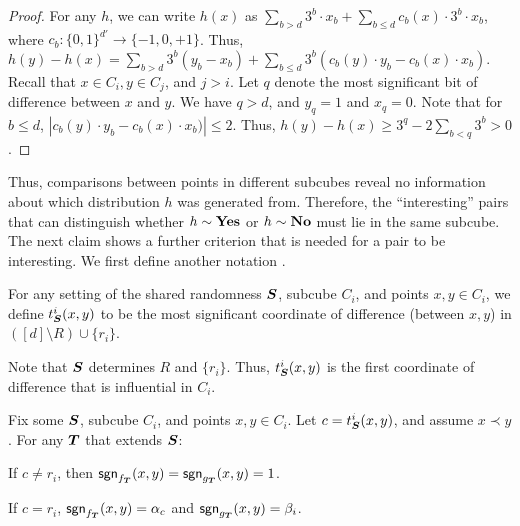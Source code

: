 \begin{proof}
	For any $h$, we can write $h(x)$ as $\sum_{b > d} 3^b \cdot x_b + \sum_{b \leq d} c_b(x) \cdot 3^b \cdot x_b$,
	where $c_b: \{0,1\}^{d'} \to \{-1,0,+1\}$. Thus,
	$h(y) - h(x) = \sum_{b > d} 3^b(y_b - x_b) + \sum_{b \leq d} 3^b(c_b(y) \cdot y_b - c_b(x) \cdot x_b)$.
	Recall that $x \in C_i , y \in C_j$, and $j > i$. Let $q$ denote
	the most significant bit of difference between $x$ and $y$. We have
	$q > d$, and $y_q = 1$ and $x_q = 0$. Note that for $b \leq d$, $|c_b(y) \cdot y_b - c_b(x) \cdot x_b)| \leq 2$.
	Thus, $h(y) - h(x) \geq 3^q - 2\sum_{b < q} 3^b > 0$.
\end{proof}

\noindent Thus, comparisons between points in different subcubes reveal no information
about which distribution $h$ was generated from. Therefore, the ``interesting'' pairs that can distinguish whether $h \sim \mathbf{Yes}$ or $h \sim \mathbf {No}$ must lie in the same subcube.
The next claim shows a further criterion that is needed for a pair to be interesting.
We first define another notation .

\begin{definition} \label{def:t} 
For any setting of the shared randomness $\boldsymbol{S}$,
subcube $C_i$, and points $x,y \in C_i$, we define $t^{i}_{\boldsymbol{S}}(x,y)$
to be the most significant coordinate of difference (between $x,y$)
in $([d] \setminus R) \cup \{r_i\}$.
\end{definition}

\noindent Note that $\boldsymbol{S}$ determines $R$ and $\{r_i\}$.
Thus, $t^{i}_{\boldsymbol{S}}(x,y)$ is the first coordinate of difference that is influential
in $C_i$.

\begin{claim}\label{clm:interesting}
Fix some $\boldsymbol{S}$, subcube $C_i$, and points $x,y \in C_i$.
Let $c = t^{i}_{\boldsymbol{S}}(x,y)$, and assume $x \prec y$.
For any $\boldsymbol{T}$ that extends $\boldsymbol{S}$:
\begin{compactitem}
    \item If $c \neq r_i$, then $\mathsf{sgn}_{f_{\boldsymbol{T}}}(x,y) = \mathsf{sgn}_{g_{\boldsymbol{T}}}(x,y) = 1$.
    \item If $c = r_i$, $\mathsf{sgn}_{f_{\boldsymbol{T}}}(x,y) = \alpha_{c}$ and $\mathsf{sgn}_{g_{\boldsymbol{T}}}(x,y) = \beta_i$.
\end{compactitem}
\end{claim}

